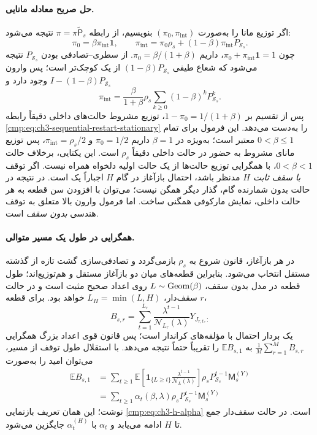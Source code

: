 \paragraph{حل صریح معادله مانایی.}
اگر توزیع مانا را
به‌صورت
$(\pi_0,\pi_{\mathrm{int}})$
بنویسیم،
از رابطه
$\pi=\pi\widetilde{\mathsf P}_s$
نتیجه می‌شود:
\[
\pi_0=\beta\pi_{\mathrm{int}}\mathbf1,
\qquad
\pi_{\mathrm{int}}
=\pi_0\rho_s
+(1-\beta)\pi_{\mathrm{int}}P_{\mathcal S_s}.
\]
چون
$\pi_0+\pi_{\mathrm{int}}\mathbf1=1$،
داریم
$\pi_0=\beta/(1+\beta)$.
از سطری--تصادفی
بودن $P_{\mathcal S_s}$
نتیجه می‌شود که
شعاع طیفی
$(1-\beta)P_{\mathcal S_s}$
از یک کوچک‌تر است؛
پس وارون
$I-(1-\beta)P_{\mathcal S_s}$
وجود دارد و
\[
\pi_{\mathrm{int}}
=\frac{\beta}{1+\beta}
\rho_s\sum_{k\ge0}
(1-\beta)^kP_{\mathcal S_s}^k.
\]
پس از تقسیم بر
$1-\pi_0=1/(1+\beta)$،
توزیع مشروط
حالت‌های داخلی
دقیقاً رابطه
\eqref{cmp:eq:ch3-sequential-restart-stationary}
را به‌دست می‌دهد.
این فرمول برای تمام $0<\beta\le1$ معتبر است؛
به‌ویژه در $\beta=1$ داریم
$\pi_0=1/2$ و
$\pi_{\mathrm{int}}=\rho_s/2$،
پس توزیع مانای مشروط به حضور در حالت داخلی
دقیقاً $\rho_s$ است. این یکتایی، برخلاف حالت
$0<\beta<1$، با همگرایی توزیع حالت‌ها از یک
حالت اولیه دلخواه همراه نیست.
اگر توقف
\emph{با سقف ثابت $H$}
مدنظر باشد،
احتمال بازآغاز
در گام $H$
اجباراً یک است.
در نتیجه در حالت
بدون شمارنده گام،
گذار دیگر همگن
نیست؛ می‌توان
با افزودن سن قطعه
به هر حالت داخلی،
نمایش مارکوفی
همگنی ساخت.
اما فرمول وارون
بالا متعلق به
توقف هندسی
\emph{بدون سقف}
است.

\paragraph{همگرایی در طول یک مسیر متوالی.}
در هر بازآغاز،
قانون شروع به
$\rho_s$ بازمی‌گردد
و تصادفی‌سازی
گشت تازه
از گذشته مستقل
انتخاب می‌شود.
بنابراین قطعه‌های
میان دو بازآغاز
مستقل و هم‌توزیع‌اند؛
طول قطعه در مدل
بدون سقف،
$L\sim{\rm Geom}(\beta)$
روی اعداد صحیح
مثبت است و
در حالت سقف‌دار،
$L_H=\min(L,H)$
خواهد بود.
برای قطعه $r$،
\[
B_{s,r}
=\sum_{t=1}^{L_r}
\frac{\lambda^{t-1}}
{\mathcal N_{L_r}(\lambda)}
Y_{J_{r,t},:}
\]
یک بردار احتمال
با مؤلفه‌های
کراندار است؛
پس قانون قوی
اعداد بزرگ
همگرایی
$\frac1M\sum_{r=1}^MB_{s,r}$
به $\mathbb E B_{s,1}$
را تقریباً حتماً
نتیجه می‌دهد.
با استقلال
طول توقف از
مسیر،
می‌توان
امید را به‌صورت
\[
\begin{aligned}
\mathbb E B_{s,1}
&=\sum_{t\ge1}
\mathbb E\left[
\mathbf1_{\{L\ge t\}}
\frac{\lambda^{t-1}}
{\mathcal N_L(\lambda)}
\right]
\rho_sP_{\mathcal S_s}^{t-1}\mathsf M_s^{(Y)}\\
&=\sum_{t\ge1}
\alpha_t(\beta,\lambda)
\rho_sP_{\mathcal S_s}^{t-1}\mathsf M_s^{(Y)}
\end{aligned}
\]
نوشت؛ این همان
تعریف بازنمایی
\eqref{cmp:eq:ch3-h-alpha}
است. در حالت
سقف‌دار جمع
تا $H$ ادامه
می‌یابد و
$\alpha_t$
با $\alpha_t^{(H)}$
جایگزین می‌شود.

